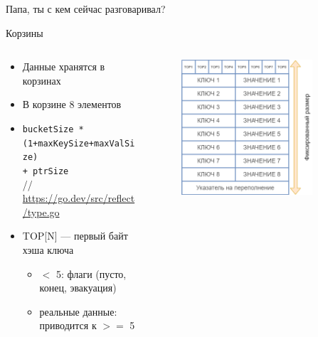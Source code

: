 \documentclass[aspectratio=169]{beamer}
\begin{document}
\begin{frame}
        \center \huge Папа, ты с кем сейчас разговаривал?
\end{frame}

\begin{frame}{Корзины}
        \begin{columns}[t,onlytextwidth]
                \begin{column}{0.50\textwidth}
                        \begin{itemize}
                                \item Данные хранятся в корзинах
                                \item В корзине 8 элементов
                                \item \texttt{bucketSize * \\(1+maxKeySize+maxValSize)\\+ ptrSize}\\
                                // \textcolor{blue}{\href{https://go.dev/src/reflect/type.go}{https://go.dev/src/reflect/type.go}}
                                \item TOP[N] --- первый байт хэша ключа
                                \begin{itemize}
                                        \item $<$ 5: флаги (пусто, конец, эвакуация)
                                        \item реальные данные: приводится к $>=$ 5
                                \end{itemize}
                        \end{itemize}
                \end{column}
                \begin{column}{0.48\textwidth}
                        \begin{figure}
                                \includegraphics[width=0.85\textwidth]{img/bucketsize.png} \\

\end{figure}
\end{column}
\end{columns}
\end{frame}
\end{document}
